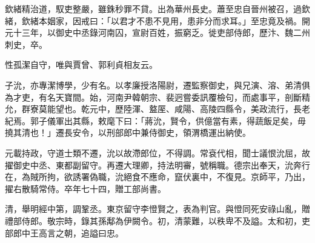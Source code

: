 \begin{pinyinscope}
 欽緒精治道，馭吏整嚴，雖銖秒罪不貸。出為華州長史。蕭至忠自晉州被召，過欽緒，欽緒本姻家，因戒曰：「以君才不患不見用，患非分而求耳。」至忠竟及禍。開元十三年，以御史中丞錄河南囚，宣尉百姓，振窮乏。徙吏部侍郎，歷汴、魏二州刺史，卒。



 性孤潔自守，唯與賈曾、郭利貞相友云。



 子沇，亦專潔博學，少有名。以孝廉授洛陽尉，遷監察御史，與兄演、溶、弟清俱為才吏，有名天寶間。始，河南尹韓朝宗、裴迥嘗委訊覆檢句，而處事平，剖斷精允，群寮莫能望也。乾元中，歷陸渾、盩厔、咸陽、高陵四縣令，美政流行，長老紀焉。郭子儀軍出其縣，敕麾下曰：「蔣沇，賢令，供億當有素，得蔬飯足矣，毋撓其清也！」遷長安令，以刑部郎中兼侍御史，領渭橋運出納使。



 元載持政，守道士類不遷，沇以故滯郎位，不得調。常袞代相，聞士議恨沇屈，故擢御史中丞、東都副留守。再遷大理卿，持法明審，號稱職。德宗出奉天，沇奔行在，為賊所拘，欲誘署偽職，沇絕食不應命，竄伏裏中，不復見。京師平，乃出，擢右散騎常侍。卒年七十四，贈工部尚書。



 清，舉明經中第，調鞏丞。東京留守李憕賢之，表為判官。與憕同死安祿山亂，贈禮部侍郎。敬宗時，錄其孫鄅為伊闕令。初，清蒙難，以秩卑不及謚。太和初，吏部郎中王高言之朝，追謚曰忠。



\end{pinyinscope}